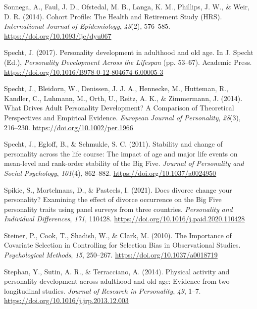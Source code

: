 \documentclass[
  english,
  man, noextraspace]{apa7}
\begin{document}
\leavevmode\hypertarget{ref-sonnegaCohortProfileHealth2014}{}%
Sonnega, A., Faul, J. D., Ofstedal, M. B., Langa, K. M., Phillips, J. W., \& Weir, D. R. (2014). Cohort Profile: The Health and Retirement Study (HRS). \emph{International Journal of Epidemiology}, \emph{43}(2), 576--585. \url{https://doi.org/10.1093/ije/dyu067}

\leavevmode\hypertarget{ref-spechtPersonalityDevelopmentAdulthood2017}{}%
Specht, J. (2017). Personality development in adulthood and old age. In J. Specht (Ed.), \emph{Personality Development Across the Lifespan} (pp. 53--67). Academic Press. \url{https://doi.org/10.1016/B978-0-12-804674-6.00005-3}

\leavevmode\hypertarget{ref-spechtWhatDrivesAdult2014}{}%
Specht, J., Bleidorn, W., Denissen, J. J. A., Hennecke, M., Hutteman, R., Kandler, C., Luhmann, M., Orth, U., Reitz, A. K., \& Zimmermann, J. (2014). What Drives Adult Personality Development? A Comparison of Theoretical Perspectives and Empirical Evidence. \emph{European Journal of Personality}, \emph{28}(3), 216--230. \url{https://doi.org/10.1002/per.1966}

\leavevmode\hypertarget{ref-spechtStabilityChangePersonality2011}{}%
Specht, J., Egloff, B., \& Schmukle, S. C. (2011). Stability and change of personality across the life course: The impact of age and major life events on mean-level and rank-order stability of the Big Five. \emph{Journal of Personality and Social Psychology}, \emph{101}(4), 862--882. \url{https://doi.org/10.1037/a0024950}

\leavevmode\hypertarget{ref-spikicDoesDivorceChange2021}{}%
Spikic, S., Mortelmans, D., \& Pasteels, I. (2021). Does divorce change your personality? Examining the effect of divorce occurrence on the Big Five personality traits using panel surveys from three countries. \emph{Personality and Individual Differences}, \emph{171}, 110428. \url{https://doi.org/10.1016/j.paid.2020.110428}

\leavevmode\hypertarget{ref-steinerImportanceCovariateSelection2010}{}%
Steiner, P., Cook, T., Shadish, W., \& Clark, M. (2010). The Importance of Covariate Selection in Controlling for Selection Bias in Observational Studies. \emph{Psychological Methods}, \emph{15}, 250--267. \url{https://doi.org/10.1037/a0018719}

\leavevmode\hypertarget{ref-stephanPhysicalActivityPersonality2014}{}%
Stephan, Y., Sutin, A. R., \& Terracciano, A. (2014). Physical activity and personality development across adulthood and old age: Evidence from two longitudinal studies. \emph{Journal of Research in Personality}, \emph{49}, 1--7. \url{https://doi.org/10.1016/j.jrp.2013.12.003}
\end{document}
